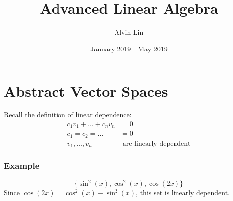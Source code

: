 \documentclass{math}
\title{Advanced Linear Algebra}
\author{Alvin Lin}
\date{January 2019 - May 2019}
\begin{document}
\maketitle

\section*{Abstract Vector Spaces}
Recall the definition of linear dependence:
\begin{align*}
  c_1v_1+\dots+c_nv_n &= 0 \\
  c_1 = c_2 = \dots &= 0 \\
  v_1,\dots,v_n &\text{ are linearly dependent}
\end{align*}

\subsubsection*{Example}
\[ \{\sin^2(x),\cos^2(x),\cos(2x)\} \]
Since \( \cos(2x) = \cos^2(x)-\sin^2(x) \), this set is linearly dependent.
\end{document}
